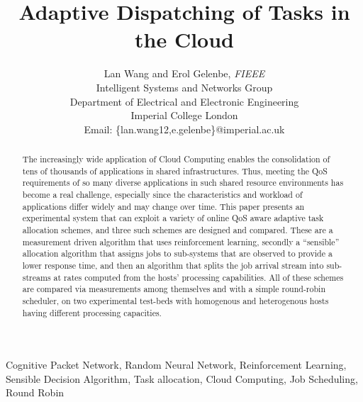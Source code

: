 \documentclass[journal]{IEEEtran}
\begin{document}
\title{Adaptive Dispatching of Tasks in the Cloud}


\author{Lan Wang and Erol Gelenbe, {\small \em FIEEE}\\
Intelligent Systems and Networks Group\\
Department of Electrical and Electronic Engineering\\
Imperial College London\\
Email: \{lan.wang12,e.gelenbe\}@imperial.ac.uk}

\maketitle



\begin{abstract}
The increasingly wide application of Cloud Computing enables the consolidation of tens of thousands of applications in shared infrastructures. Thus, meeting the QoS requirements of so many
diverse applications in such shared resource environments has become a real challenge, especially since the characteristics and workload of applications differ widely and may change over time. This paper presents
an experimental system that can exploit a variety of online QoS aware adaptive task allocation schemes, and three such schemes are designed and compared.
These are a measurement driven algorithm that uses reinforcement learning, secondly a ``sensible'' allocation algorithm that assigns jobs to sub-systems that are observed to provide a
lower response time, and then an algorithm that splits the job arrival stream into sub-streams 
at rates computed from the hosts' processing capabilities. All of these schemes are compared via measurements
among themselves and with a simple round-robin scheduler, on two experimental test-beds with homogenous and heterogenous hosts having
different processing capacities. 
\end{abstract}

\begin{IEEEkeywords} 
Cognitive Packet Network, Random Neural Network, Reinforcement Learning, Sensible Decision Algorithm, Task allocation, Cloud Computing, Job Scheduling, Round Robin
\end{IEEEkeywords}
\end{document}
